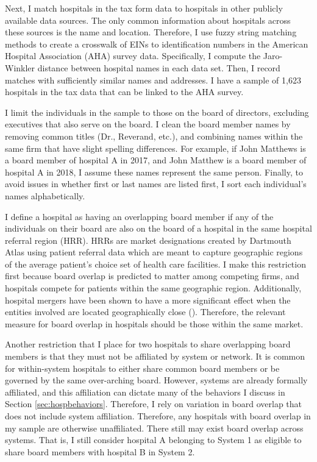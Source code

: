 \documentclass[12pt]{article}
\begin{document}
   Next, I match hospitals in the tax form data to hospitals in other publicly available data sources. The only common information about hospitals across these sources is the name and location. Therefore, I use fuzzy string matching methods to create a crosswalk of EINs to identification numbers in the American Hospital Association (AHA) survey data. Specifically, I compute the Jaro-Winkler distance between hospital names in each data set. Then, I record matches with sufficiently similar names and addresses. I have a sample of 1,623 hospitals in the tax data that can be linked to the AHA survey. 

    I limit the individuals in the sample to those on the board of directors, excluding executives that also serve on the board. I clean the board member names by removing common titles (Dr., Reverand, etc.), and combining names within the same firm that have slight spelling differences. For example, if John Matthews is a board member of hospital A in 2017, and John Matthew is a board member of hospital A in 2018, I assume these names represent the same person. Finally, to avoid issues in whether first or last names are listed first, I sort each individual's names alphabetically. 

    I define a hospital as having an overlapping board member if any of the individuals on their board are also on the board of a hospital in the same hospital referral region (HRR). HRRs are market designations created by Dartmouth Atlas using patient referral data which are meant to capture geographic regions of the average patient's choice set of health care facilities. I make this restriction first because board overlap is predicted to matter among competing firms, and hospitals compete for patients within the same geographic region. Additionally, hospital mergers have been shown to have a more significant effect when the entities involved are located geographically close (\cite{cooper2019price}). Therefore, the relevant measure for board overlap in hospitals should be those within the same market. 

    Another restriction that I place for two hospitals to share overlapping board members is that they must not be affiliated by system or network. It is common for within-system hospitals to either share common board members or be governed by the same over-arching board. However, systems are already formally affiliated, and this affiliation can dictate many of the behaviors I discuss in Section \ref{sec:hospbehaviors}. Therefore, I rely on variation in board overlap that does not include system affiliation. Therefore, any hospitals with board overlap in my sample are otherwise unaffiliated. There still may exist board overlap across systems. That is, I still consider hospital A belonging to System 1 as eligible to share board members with hospital B in System 2. 
\end{document}
